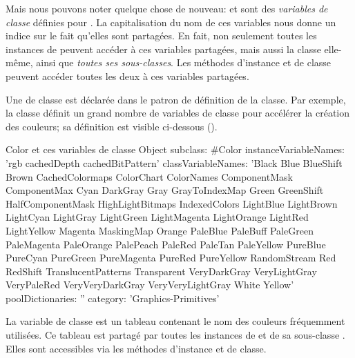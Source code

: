 \documentclass[a4paper,10pt,twoside]{book}
\begin{document}
Mais nous pouvons noter quelque chose de nouveau:  et  sont des \emph{variables de classe} d\'efinies pour .
La capitalisation du nom de ces variables nous donne un indice sur le fait qu'elles sont partag\'ees.
En fait, non seulement toutes les instances de  peuvent acc\'eder
\`a ces variables partag\'ees, mais aussi la classe  elle-m\^eme, ainsi que \emph{toutes ses sous-classes}.
Les m\'ethodes d'instance et de classe peuvent acc\'eder toutes les deux
\`a ces variables partag\'ees.


Une  de classe est d\'eclar\'ee dans le patron
de d\'efinition de la classe.
Par exemple, la classe  d\'efinit un grand nombre de variables
de classe pour acc\'el\'erer la cr\'eation des couleurs;
sa d\'efinition est visible ci-dessous ().

\begin{classdef}[Color]{Color et ces variables de classe}
Object subclass: #Color 	
        instanceVariableNames: 'rgb cachedDepth cachedBitPattern'
        classVariableNames: 'Black Blue BlueShift Brown CachedColormaps ColorChart ColorNames ComponentMask ComponentMax Cyan DarkGray Gray GrayToIndexMap Green GreenShift HalfComponentMask HighLightBitmaps IndexedColors LightBlue LightBrown LightCyan LightGray LightGreen LightMagenta LightOrange LightRed LightYellow Magenta MaskingMap Orange PaleBlue PaleBuff PaleGreen PaleMagenta PaleOrange PalePeach PaleRed PaleTan PaleYellow PureBlue PureCyan PureGreen PureMagenta PureRed PureYellow RandomStream Red RedShift TranslucentPatterns Transparent VeryDarkGray VeryLightGray VeryPaleRed VeryVeryDarkGray VeryVeryLightGray White Yellow'
        poolDictionaries: '' 	
        category: 'Graphics-Primitives'
\end{classdef}

La variable de classe  est un tableau contenant le nom des
couleurs fr\'equemment utilis\'ees. Ce tableau est partag\'e par toutes les instances de  et de sa sous-classe . 
Elles sont accessibles via les m\'ethodes d'instance et de classe.
\end{document}
